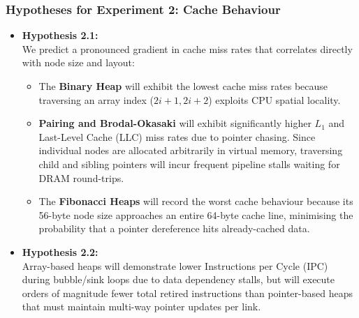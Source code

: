 \subsubsection{Hypotheses for Experiment 2: Cache Behaviour}
\begin{itemize}
  \item \textbf{Hypothesis 2.1:} \\
  We predict a pronounced gradient in cache miss rates that correlates directly with node size and layout:
  \begin{itemize}
    \item The \textbf{Binary Heap} will exhibit the lowest cache miss rates because traversing an array index ($2i+1, 2i+2$) exploits CPU spatial locality.
    \item \textbf{Pairing and Brodal-Okasaki} will exhibit significantly higher $L_1$ and Last-Level Cache (LLC) miss rates due to pointer chasing. Since individual nodes are allocated arbitrarily in virtual memory, traversing child and sibling pointers will incur frequent pipeline stalls waiting for DRAM round-trips.
    \item The \textbf{Fibonacci Heaps} will record the worst cache behaviour because its 56-byte node size approaches an entire 64-byte cache line, minimising the probability that a pointer dereference hits already-cached data.
  \end{itemize}
  \item \textbf{Hypothesis 2.2:} \\
  Array-based heaps will demonstrate lower Instructions per Cycle (IPC) during bubble/sink loops due to data dependency stalls, but will execute orders of magnitude fewer total retired instructions than pointer-based heaps that must maintain multi-way pointer updates per link.
\end{itemize}
